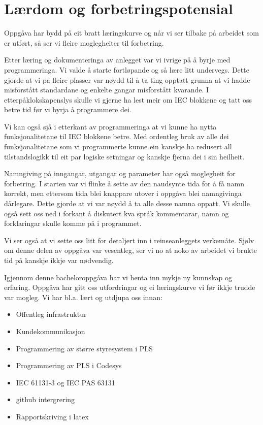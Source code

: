 \section{Lærdom og forbetringspotensial}
\thispagestyle{fancy}

Oppgåva har bydd på eit bratt læringskurve og når vi ser tilbake på arbeidet som er utført, 
så ser vi fleire moglegheiter til forbetring.

Etter læring og dokumenteringa av anlegget var vi ivrige på å byrje med programmeringa.
Vi valde å starte fortløpande og så lære litt undervegs.
Dette gjorde at vi på fleire plasser var nøydd til å ta ting opptatt grunna at vi hadde misforstått standardane og enkelte gangar misforstått kvarande.
I etterpåklokskapenslys skulle vi gjerne ha lest meir om \gls{IEC} blokkene og tatt oss betre tid før vi byrja å programmere dei.

Vi kan også sjå i etterkant av programmeringa at vi kunne ha nytta funksjonalitetane til \gls{IEC} blokkene betre.
Med ordentleg bruk av alle dei funksjonalitetane som vi programmerte kunne ein kanskje ha redusert all tilstandslogikk
til eit par logiske setningar og kanskje fjerna dei i sin heilheit.

Namngiving på inngangar, utgangar og parameter har også moglegheit for forbetring.
I starten var vi flinke å sette av den naudsynte tida for å få namn korrekt, men ettersom tida blei knappare utover i oppgåva
blei namngivinga dårlegare. Dette gjorde at vi var nøydd å ta alle desse namna oppatt. \newline
Vi skulle også sett oss ned i forkant å diskutert kva språk kommentarar, namn og forklaringar skulle komme på i programmet.

Vi ser også at vi sette oss litt for detaljert inn i reinseanleggets verkemåte.
Sjølv om denne delen av oppgåva var vesentleg, ser vi no at noko av arbeidet vi brukte tid på kanskje ikkje var nødvendig.

Igjennom denne bacheloroppgåva har vi henta inn mykje ny kunnskap og erfaring.
Oppgåva har gitt oss utfordringar og ei læringskurve vi før ikkje trudde var mogleg.
Vi har bl.a. lært og utdjupa oss innan:

\begin{itemize}
    \item Offentleg infrastruktur
    \item Kundekommunikasjon
    \item Programmering av større styresystem i \gls{PLS}
    \item Programmering av \gls{PLS} i \gls{Codesys}
    \item \gls{IEC} 61131-3 og \gls{IEC} \gls{PAS} 63131
    \item \Gls{github} intergrering
    \item Rapportskriving i \gls{latex}
\end{itemize}






